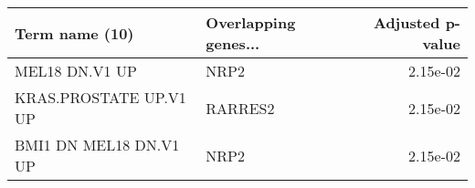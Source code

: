 \begin{tabular}{llr}
\toprule
        Term name (10) & Overlapping genes... &  Adjusted p-value \\
\midrule
        MEL18 DN.V1 UP &                 NRP2 &          2.15e-02 \\
KRAS.PROSTATE UP.V1 UP &              RARRES2 &          2.15e-02 \\
BMI1 DN MEL18 DN.V1 UP &                 NRP2 &          2.15e-02 \\
\bottomrule
\end{tabular}

